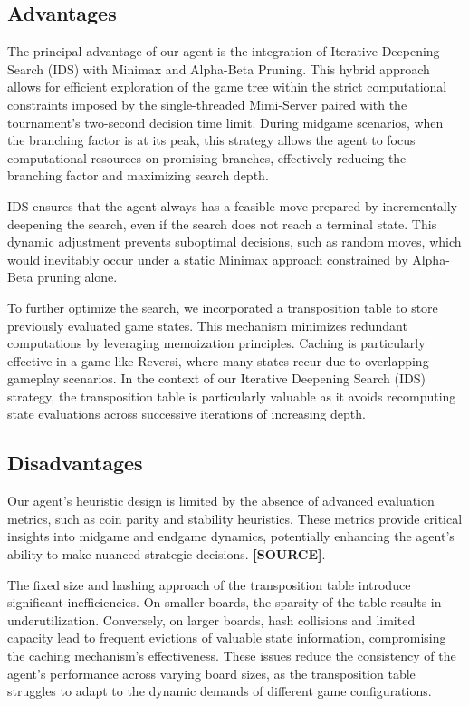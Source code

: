 \documentclass[11pt]{article}
\begin{document}
\subsection*{Advantages}
The principal advantage of our agent is the integration of Iterative Deepening Search (IDS) with Minimax and Alpha-Beta Pruning. This hybrid approach allows for efficient exploration of the game tree within the strict computational constraints imposed by the single-threaded Mimi-Server paired with the tournament’s two-second decision time limit. During midgame scenarios, when the branching factor is at its peak, this strategy allows the agent to focus computational resources on promising branches, effectively reducing the branching factor and maximizing search depth.

IDS ensures that the agent always has a feasible move prepared by incrementally deepening the search, even if the search does not reach a terminal state. This dynamic adjustment prevents suboptimal decisions, such as random moves, which would inevitably occur under a static Minimax approach constrained by Alpha-Beta pruning alone.

To further optimize the search, we incorporated a transposition table to store previously evaluated game states. This mechanism minimizes redundant computations by leveraging memoization principles. Caching is particularly effective in a game like Reversi, where many states recur due to overlapping gameplay scenarios. In the context of our Iterative Deepening Search (IDS) strategy, the transposition table is particularly valuable as it avoids recomputing state evaluations across successive iterations of increasing depth.

\subsection*{Disadvantages}
Our agent's heuristic design is limited by the absence of advanced evaluation metrics, such as coin parity and stability heuristics. These metrics provide critical insights into midgame and endgame dynamics, potentially enhancing the agent's ability to make nuanced strategic decisions. \textbf{[SOURCE]}.

The fixed size and hashing approach of the transposition table introduce significant inefficiencies. On smaller boards, the sparsity of the table results in underutilization. Conversely, on larger boards, hash collisions and limited capacity lead to frequent evictions of valuable state information, compromising the caching mechanism's effectiveness. These issues reduce the consistency of the agent's performance across varying board sizes, as the transposition table struggles to adapt to the dynamic demands of different game configurations.
\end{document}
